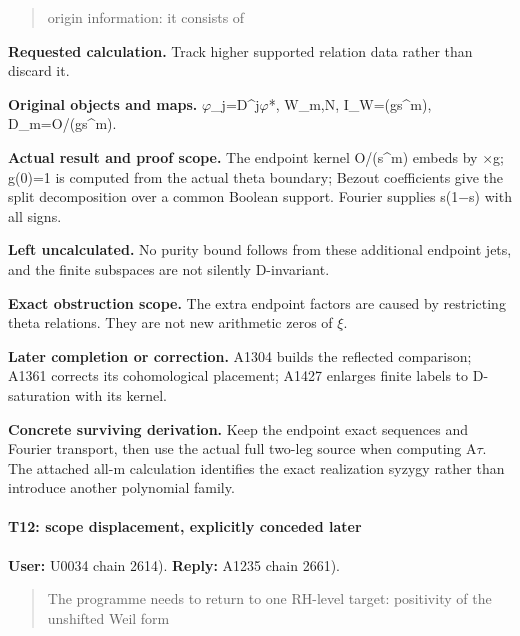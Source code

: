 \begin{quote}
origin information: it consists of
\end{quote}

\textbf{Requested calculation.} Track higher supported relation data
rather than discard it.

\textbf{Original objects and maps.}
\allowbreak{}\ensuremath{φ}\allowbreak{}\_j=D\textasciicircum{}j\allowbreak{}\ensuremath{φ}\allowbreak{}*,
W\_m,N, I\_W=(gs\^{}m), D\_m=O/(gs\^{}m).

\textbf{Actual result and proof scope.} The endpoint kernel O/(s\^{}m)
embeds by \allowbreak{}\ensuremath{×}\allowbreak{}g; g(0)=1 is computed
from the actual theta boundary; Bezout coefficients give the split
decomposition over a common Boolean support. Fourier supplies
s(1\allowbreak{}\ensuremath{−}\allowbreak{}s) with all signs.

\textbf{Left uncalculated.} No purity bound follows from these
additional endpoint jets, and the finite subspaces are not silently
D-invariant.

\textbf{Exact obstruction scope.} The extra endpoint factors are caused
by restricting theta relations. They are not new arithmetic zeros of
\allowbreak{}\ensuremath{ξ}\allowbreak{}.

\textbf{Later completion or correction.} A1304 builds the reflected
comparison; A1361 corrects its cohomological placement; A1427 enlarges
finite labels to D-saturation with its kernel.

\textbf{Concrete surviving derivation.} Keep the endpoint exact
sequences and Fourier transport, then use the actual full two-leg source
when computing A\allowbreak{}\ensuremath{τ}\allowbreak{}. The attached
all-m calculation identifies the exact realization syzygy rather than
introduce another polynomial family.

\paragraph{T12: scope displacement, explicitly conceded
later}\label{t12-scope-displacement-explicitly-conceded-later}

\textbf{User:} U0034
\protect{} chain 2614).
\textbf{Reply:} A1235
\protect{} chain 2661).

\begin{quote}
The programme needs to return to one RH-level target: positivity of the
unshifted Weil form
\end{quote}

